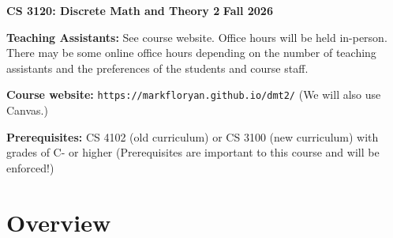 \documentclass[12pt]{article}
\begin{document}
\textbf{\Large CS 3120: Discrete Math and Theory 2} \hfill \textbf{\Large Fall 2026}

\vskip 0.5in 


\vskip 0.1in
\textbf{Teaching Assistants:} See course website.  Office hours will be held in-person. There may be some online office hours depending on the number of teaching assistants and the preferences of the students and course staff.

\vskip 0.1in
\textbf{Course website:} {\tt https://markfloryan.github.io/dmt2/} (We will also use Canvas.)

\textbf{Prerequisites:} CS 4102 (old curriculum) or CS 3100 (new curriculum) with grades of C- or higher (Prerequisites are important to this course and will be enforced!)

\section*{Overview}
\end{document}
